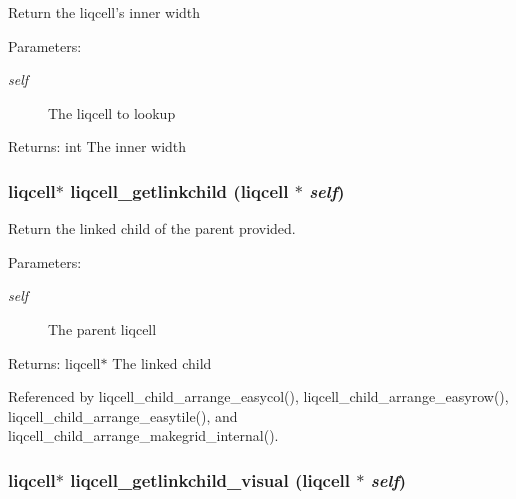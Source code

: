 Return the liqcell's inner width \begin{Desc}
\item[Parameters:]
\begin{description}
\item[{\em self}]The liqcell to lookup \end{description}
\end{Desc}
\begin{Desc}
\item[Returns:]int The inner width \end{Desc}
\subsubsection[{liqcell\_\-getlinkchild}]{\setlength{\rightskip}{0pt plus 5cm}liqcell$\ast$ liqcell\_\-getlinkchild (liqcell $\ast$ {\em self})}\label{d5/da2/liqcell_8c_a1bfa8ed04347c6463eb2af7ba302144}


Return the linked child of the parent provided. \begin{Desc}
\item[Parameters:]
\begin{description}
\item[{\em self}]The parent liqcell \end{description}
\end{Desc}
\begin{Desc}
\item[Returns:]liqcell$\ast$ The linked child \end{Desc}


Referenced by liqcell\_\-child\_\-arrange\_\-easycol(), liqcell\_\-child\_\-arrange\_\-easyrow(), liqcell\_\-child\_\-arrange\_\-easytile(), and liqcell\_\-child\_\-arrange\_\-makegrid\_\-internal().
\subsubsection[{liqcell\_\-getlinkchild\_\-visual}]{\setlength{\rightskip}{0pt plus 5cm}liqcell$\ast$ liqcell\_\-getlinkchild\_\-visual (liqcell $\ast$ {\em self})}\label{d5/da2/liqcell_8c_5e6e1ee06c97ff0f18831d82ff943705}



